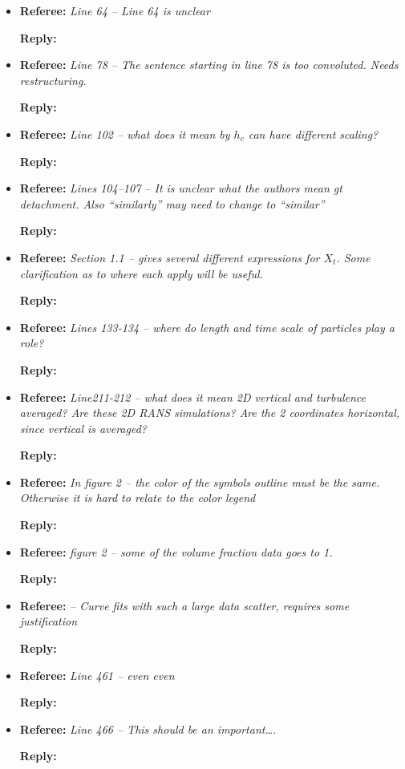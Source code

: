 \documentclass[12pt]{article}
\newcommand{\MinorReply}[3]{\filbreak\noindent
\textbf{Referee:}
\emph{#1 -- #2}

\textbf{Reply:} {\color{blue}{#3}}
}
\begin{document}
\begin{itemize}
    \item \MinorReply{Line 64}{Line 64 is unclear}{}
    \item \MinorReply{Line 78}{The sentence starting in line 78 is too convoluted. Needs restructuring.}{}
    \item \MinorReply{Line 102}{what does it mean by $h_c$ can have different scaling?}{}
    \item \MinorReply{Lines 104--107}{It is unclear what the authors mean gt detachment. Also “similarly” may need to change to “similar”}{}
    \item \MinorReply{Section 1.1}{gives several different expressions for $X_t$. Some clarification as to where each apply will be useful.}{}
    \item \MinorReply{Lines 133-134}{where do length and time scale of particles play a role?}{}
    \item \MinorReply{Line211-212}{what does it mean 2D vertical and turbulence averaged? Are these 2D RANS simulations? Are the 2 coordinates horizontal, since vertical is averaged?}{}
    \item \MinorReply{In figure 2}{the color of the symbols outline must be the same. Otherwise it is hard to relate to the color legend}{}
    \item \MinorReply{figure 2}{some of the volume fraction data goes to 1.    }{}
    \item \MinorReply{}{Curve fits with such a large data scatter, requires some justification}{}
    \item \MinorReply{Line 461}{even even}{}
    \item \MinorReply{Line 466}{This should be an important….}{}
\end{itemize}
\end{document}

